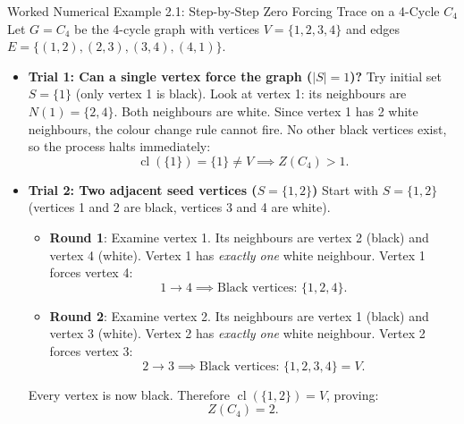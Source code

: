 \documentclass[11pt]{article}
\begin{document}
\begin{callbox}{Worked Numerical Example 2.1: Step-by-Step Zero Forcing Trace on a 4-Cycle $C_4$}
Let $G = C_4$ be the 4-cycle graph with vertices $V = \{1, 2, 3, 4\}$ and edges $E = \{(1,2), (2,3), (3,4), (4,1)\}$.
\begin{itemize}[leftmargin=*,nosep]
  \item \textbf{Trial 1: Can a single vertex force the graph ($|S|=1$)?}
  Try initial set $S = \{1\}$ (only vertex 1 is black).
  Look at vertex 1: its neighbours are $N(1) = \{2, 4\}$.
  Both neighbours are white. Since vertex 1 has 2 white neighbours, the colour change rule cannot fire.
  No other black vertices exist, so the process halts immediately:
  \begin{equation}
    \operatorname{cl}(\{1\}) = \{1\} \ne V \implies Z(C_4) > 1.
  \end{equation}
  \item \textbf{Trial 2: Two adjacent seed vertices ($S = \{1, 2\}$)}
  Start with $S = \{1, 2\}$ (vertices 1 and 2 are black, vertices 3 and 4 are white).
  \begin{itemize}[leftmargin=*,nosep]
    \item \textbf{Round 1}: Examine vertex 1. Its neighbours are vertex 2 (black) and vertex 4 (white).
    Vertex 1 has \emph{exactly one} white neighbour. Vertex 1 forces vertex 4:
    \begin{equation}
      1 \to 4 \implies \text{Black vertices: } \{1, 2, 4\}.
    \end{equation}
    \item \textbf{Round 2}: Examine vertex 2. Its neighbours are vertex 1 (black) and vertex 3 (white).
    Vertex 2 has \emph{exactly one} white neighbour. Vertex 2 forces vertex 3:
    \begin{equation}
      2 \to 3 \implies \text{Black vertices: } \{1, 2, 3, 4\} = V.
    \end{equation}
  \end{itemize}
  Every vertex is now black. Therefore $\operatorname{cl}(\{1, 2\}) = V$, proving:
  \begin{equation}
    Z(C_4) = 2.
  \end{equation}
\end{itemize}
\end{callbox}
\end{document}
